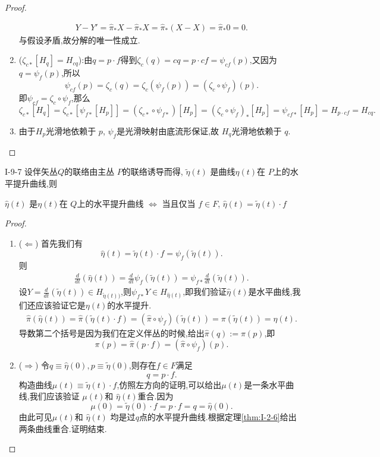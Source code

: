 \documentclass[../main.tex]{subfiles}
\begin{document}
\begin{proof}
\begin{enumerate}
    \begin{align*}
      Y - Y' = \hat{\pi}_{*} X  - \hat{\pi}_{*} X = \hat{\pi}_{*} (X -X) = \hat{\pi}_{*} 0 = 0
    .\end{align*}
    与假设矛盾,故分解的唯一性成立.
  \item ($\zeta_{c*} [H_q] = H_{cq}$):由$q = p \cdot f$得到$\zeta_c(q) = cq = p\cdot cf = \psi_{cf}(p)$,又因为$q = \psi_f(p)$,所以\[
      \psi_{cf}(p) = \zeta_c(q) = \zeta_c(\psi_f(p)) = (\zeta_c \circ \psi_f)(p) 
  .\] 
  即$\psi_{cf} = \zeta_c \circ \psi_f$,那么
    \[
      \zeta_{c*}[H_q] = \zeta_{c*}[\psi_{f*}[H_p]] = (\zeta_{c*} \circ \psi_{f*})[H_p] = (\zeta_c \circ \psi_f)_*[H_p] = \psi_{cf*}[H_p] = H_{p\cdot cf} = H_{cq}
    .\] 
  \item 由于$H_p$光滑地依赖于 $p$, $\psi_f$是光滑映射由底流形保证,故 $H_q$光滑地依赖于 $q$.
  \end{enumerate}
\end{proof}
\begin{theorem}
  {}{I-9-7}
  设伴矢丛$Q$的联络由主丛 $P$的联络诱导而得, $\tilde{\eta}(t)$ 是曲线$\eta(t)$在 $P$上的水平提升曲线,则
  \begin{center}
   $\hat{\eta}(t)$ 是$\eta(t)$在 $Q$上的水平提升曲线 $\Leftrightarrow$ 当且仅当 $f \in F$, $\hat{\eta}(t) = \tilde{\eta}(t) \cdot f$
 \end{center}
\end{theorem}
\begin{proof}
  \begin{enumerate}
    \item($\Leftarrow$) 首先我们有\[\hat{\eta}(t) = \tilde{\eta}(t) \cdot f = \psi_f(\tilde{\eta}(t)).\]
      则
      \begin{align*}
        \frac{d}{dt}(\hat{\eta}(t)) =  \frac{d}{dt} \psi_f(\tilde{\eta}(t)) = \psi_{f*}\frac{d}{dt} (\tilde{\eta}(t))
      .\end{align*}
      设$Y = \frac{d}{dt} (\tilde{\eta}(t)) \in H_{\tilde{\eta}(t))}$,则$\psi_{f*}Y \in H_{\hat{\eta}(t)}$,即我们验证$\hat{\eta}(t)$是水平曲线,我们还应该验证它是$\eta(t)$的水平提升.
      \begin{align*}
        \hat{\pi}(\hat{\eta}(t)) = \hat{\pi}(\tilde{\eta}(t)\cdot f) = (\hat{\pi} \circ \psi_f)(\tilde{\eta}(t)) = \pi(\tilde{\eta}(t)) = \eta(t)
      .\end{align*}
      导数第二个括号是因为我们在定义伴丛的时候,给出$\hat{\pi}(q) := \pi(p)$,即\[
        \pi(p) = \hat{\pi}(p\cdot f) = (\hat{\pi} \circ {\psi_f})(p)
      .\] 
    \item ($\Rightarrow$) 令$q \equiv \hat{\eta}(0), p \equiv \tilde{\eta}(0)$,则存在$f \in F$满足\[
   q = p\cdot f 
    .\] 构造曲线$\mu(t) \equiv \tilde{\eta}(t) \cdot f$,仿照左方向的证明,可以给出$\mu(t)$是一条水平曲线,我们应该验证 $\mu(t)$和 $\hat{\eta}(t)$重合.因为\[
   \mu(0) = \tilde{\eta}(0) \cdot f =  p \cdot f = q = \hat{\eta}(0) 
    .\] 
    由此可见$\mu(t)$和 $\hat{\eta}(t)$ 均是过$q$点的水平提升曲线.根据定理\ref{thm:I-2-6}给出两条曲线重合.证明结束.
  \end{enumerate}
\end{proof}
\end{document}

